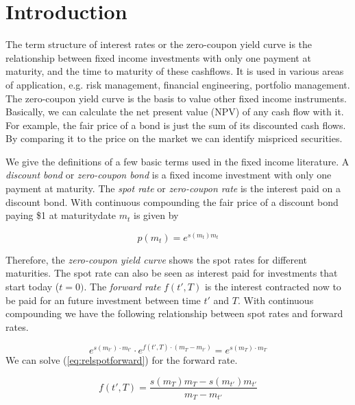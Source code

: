 \section{Introduction}


The term structure of interest rates or the zero-coupon yield curve is the relationship between fixed income investments with only one payment at maturity, and the time to maturity of these cashflows. It is used in various areas of application, e.g. risk management, financial engineering, portfolio management. The zero-coupon yield curve is the basis to value other fixed income instruments. Basically, we can calculate the net present value (NPV) of any cash flow with it. For example, the fair price of a bond is just the sum of its discounted cash flows. By comparing it to the price on the market we can identify mispriced securities.

We give the definitions of a few basic terms used in the fixed income literature. A \emph{discount bond} or \emph{zero-coupon bond} is a fixed income investment with only one payment at maturity. The \emph{spot rate} or \emph{zero-coupon rate} is the interest paid on a discount bond. With continuous compounding the fair price of a discount bond paying \$1 at maturitydate  $m_t$ is given by

\begin{equation}
  \label{eq:pricediscountbond}
  p(m_t)=e^{s(m_t)m_t}
\end{equation}

Therefore, the \emph{zero-coupon yield curve} shows the spot rates for different maturities. The spot rate can also be seen as interest paid for investments that start today ($t=0)$. The \emph{forward rate} $f(t',T)$ is the interest contracted now to be paid for an future investment between time $t'$ and $T$. With continuous compounding we have the following relationship between spot rates and forward rates.

\begin{equation}
  \label{eq:relspotforward}
  e^{s(m_{t'})\cdot m_{t'}}\cdot e^{f(t',T)\cdot (m_T-m_{t'})} = e^{s(m_T)\cdot m_T}
\end{equation}
We can solve (\ref{eq:relspotforward}) for the forward rate.

\begin{equation}
  \label{eq:forwardrate}
  f(t',T) = \frac{s(m_T)m_T - s(m_{t'})m_{t'}}{m_T-m_{t'}}
\end{equation}

